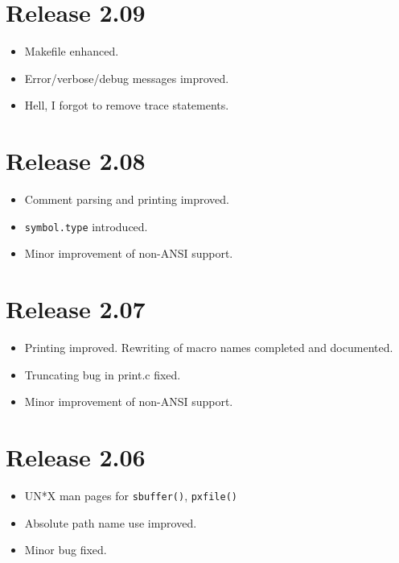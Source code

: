 \documentclass[11pt,a4paper]{scrartcl}
\newcommand\rsc[1]{\texttt{#1}}
\newcommand\File[1]{\textsf{#1}}
\newenvironment{Release}[2]{%
  \def\tmp{#2}%
  \section*{Release #1 \ifx\tmp\empty\else{\normalsize[#2]}\fi}
  \begin{itemize}
}{\end{itemize}}
\newenvironment{Fix}[1]{\item }{}
\newenvironment{New}[1]{\item }{}
\newenvironment{Update}[1]{\item }{}
\begin{document}
\begin{multicols}
 \begin{Release}{2.09}{}
  \begin{Update}{gene}
    \File{Makefile} enhanced.
  \end{Update}
  \begin{Update}{gene}
    Error/verbose/debug messages improved.
  \end{Update}
  \begin{Fix}{gene}
    Hell, I forgot to remove trace statements.
  \end{Fix}
 \end{Release}

 \begin{Release}{2.08}{}
  \begin{Update}{gene}
    Comment parsing and printing improved.
  \end{Update}
  \begin{New}{gene}
    \rsc{symbol.type} introduced.
  \end{New}
  \begin{Update}{gene}
    Minor improvement of non-ANSI support.
  \end{Update}
 \end{Release}

 \begin{Release}{2.07}{}
  \begin{Update}{gene}
    Printing improved. Rewriting of macro names completed and
    documented.
  \end{Update}
  \begin{Fix}{gene}
    Truncating bug in \File{print.c} fixed.
  \end{Fix}
  \begin{Update}{gene}
    Minor improvement of non-ANSI support.
  \end{Update}
 \end{Release}

 \begin{Release}{2.06}{}
  \begin{New}{gene}
    UN*X man pages for \verb|sbuffer()|, \verb|pxfile()|
  \end{New}
  \begin{Update}{gene}
    Absolute path name use improved.
  \end{Update}
  \begin{Fix}{gene}
    Minor bug fixed.
  \end{Fix}
 \end{Release}


\end{multicols}
\end{document}
